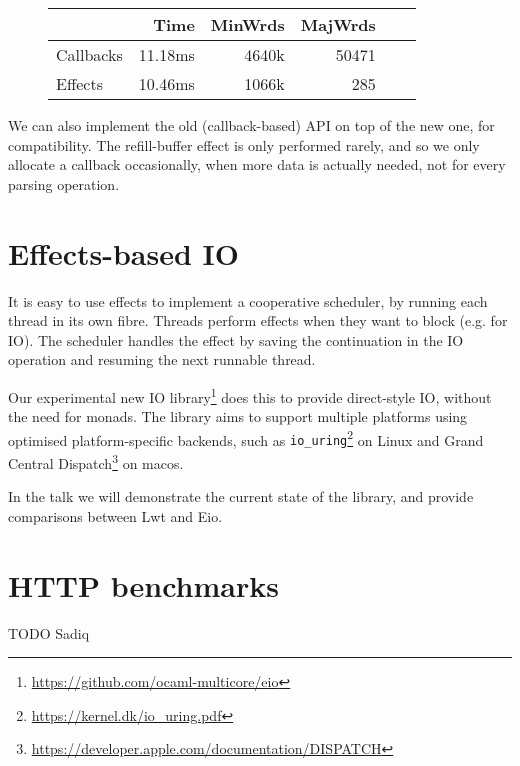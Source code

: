 \documentclass[a4paper,twocolumn]{article}
\begin{document}
\begin{figure}[h]
\begin{tabular}{l|rrrrr}
          & Time     & MinWrds &  MajWrds \\
\hline
Callbacks & 11.18ms  & 4640k   &    50471 \\
Effects   & 10.46ms  & 1066k   &      285 \\
\end{tabular}
\end{figure}

We can also implement the old (callback-based) API on top of the new one, for compatibility.
The refill-buffer effect is only performed rarely, and so we only allocate a callback occasionally,
when more data is actually needed, not for every parsing operation.

\section*{Effects-based IO}

It is easy to use effects to implement a cooperative scheduler,
by running each thread in its own fibre.
Threads perform effects when they want to block (e.g. for IO).
The scheduler handles the effect by saving the continuation in the IO operation and resuming the next runnable thread.

Our experimental new IO library\footnote{\url{https://github.com/ocaml-multicore/eio}}
does this to provide direct-style IO, without the need for monads.
The library aims to support multiple platforms using optimised platform-specific backends,
such as {\tt io\_uring}\footnote{\url{https://kernel.dk/io_uring.pdf}} on Linux and
Grand Central Dispatch\footnote{\url{https://developer.apple.com/documentation/DISPATCH}} on macos.

In the talk we will demonstrate the current state of the library, and provide comparisons between Lwt and Eio.

\section*{HTTP benchmarks}

TODO Sadiq
\end{document}
